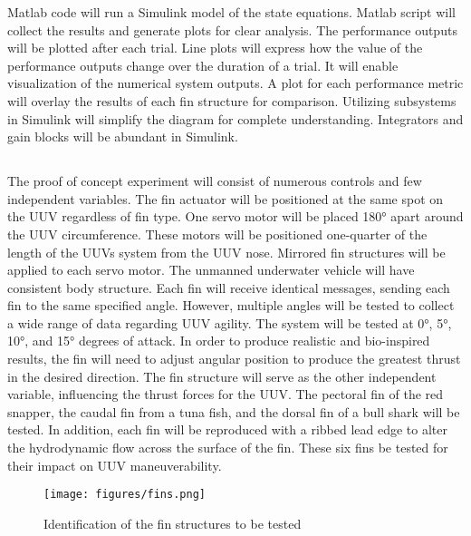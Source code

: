 \documentclass[]{IEEEtran}
\begin{document}
Matlab code will run a Simulink model of the state equations.  Matlab script will collect the results and generate plots for clear analysis.  The performance outputs will be plotted after each trial.  Line plots will express how the value of the performance outputs change over the duration of a trial.  It will enable visualization of the numerical system outputs.  A plot for each performance metric will overlay the results of each fin structure for comparison.  Utilizing subsystems in Simulink will simplify the diagram for complete understanding.  Integrators and gain blocks will be abundant in Simulink.

\subsection{}
The proof of concept experiment will consist of numerous controls and few independent variables.  The fin actuator will be positioned at the same spot on the UUV regardless of fin type.  One servo motor will be placed \ang{180} apart around the UUV circumference.  These motors will be positioned one-quarter of the length of the UUVs system from the UUV nose.  Mirrored fin structures will be applied to each servo motor.  The unmanned underwater vehicle will have consistent body structure.  Each fin will receive identical messages, sending each fin to the same specified angle.  However, multiple angles will be tested to collect a wide range of data regarding UUV agility.  The system will be tested at \ang{0}, \ang{5}, \ang{10}, and \ang{15} degrees of attack.  In order to produce realistic and bio-inspired results, the fin will need to adjust angular position to produce the greatest thrust in the desired direction.  The fin structure will serve as the other independent variable, influencing the thrust forces for the UUV.  The pectoral fin of the red snapper, the caudal fin from a tuna fish, and the dorsal fin of a bull shark will be tested.  In addition, each fin will be reproduced with a ribbed lead edge to alter the hydrodynamic flow across the surface of the fin.  These six fins be tested for their impact on UUV maneuverability.  
\begin{figure}
\begin{center}
\texttt{[image: figures/fins.png]}
\end{center}
\caption{Identification of the fin structures to be tested}
\label{fig:5}
\end{figure}
\end{document}
